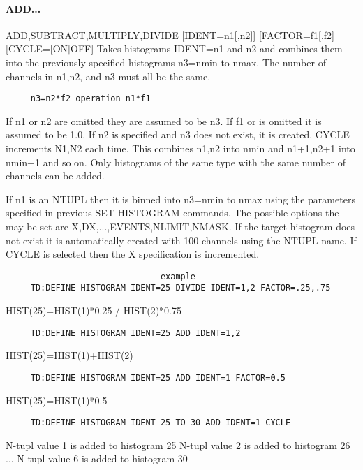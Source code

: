 \paragraph{ADD...       }
ADD,SUBTRACT,MULTIPLY,DIVIDE      [IDENT=n1[,n2]]     [FACTOR=f1[,f2]
[CYCLE=[ON$|$OFF] 
Takes   histograms  IDENT=n1  and  n2  and  combines  them  into  the
previously specified histograms  n3=nmin  to  nmax.   The  number  of
channels in n1,n2, and n3 must all be the same.  
\begin{verbatim}
     n3=n2*f2 operation n1*f1 
\end{verbatim}
If  n1  or  n2  are  omitted  they are assumed to be n3.  If f1 or is
omitted it is assumed to be 1.0.  If n2 is specified and n3 does  not
exist,  it  is  created.   CYCLE  increments  N1,N2  each time.  This
combines n1,n2 into nmin and n1+1,n2+1 into nmin+1 and so  on.   Only
histograms  of  the same type with the same number of channels can be
added.  

If  n1  is  an NTUPL then it is binned into n3=nmin to nmax using the
parameters  specified  in  previous  SET  HISTOGRAM  commands.    The
possible options the may be set are X,DX,...,EVENTS,NLIMIT,NMASK.  If
the target histogram does not exist it is automatically created  with
100  channels  using the NTUPL name.  If CYCLE is selected then the X
specification is incremented.  
\begin{verbatim}
                               example
     TD:DEFINE HISTOGRAM IDENT=25 DIVIDE IDENT=1,2 FACTOR=.25,.75 
\end{verbatim}
HIST(25)=HIST(1)*0.25 / HIST(2)*0.75 
\begin{verbatim}
     TD:DEFINE HISTOGRAM IDENT=25 ADD IDENT=1,2 
\end{verbatim}
HIST(25)=HIST(1)+HIST(2) 
\begin{verbatim}
     TD:DEFINE HISTOGRAM IDENT=25 ADD IDENT=1 FACTOR=0.5 
\end{verbatim}
HIST(25)=HIST(1)*0.5 
\begin{verbatim}
     TD:DEFINE HISTOGRAM IDENT 25 TO 30 ADD IDENT=1 CYCLE 
\end{verbatim}
N-tupl value 1 is added to histogram 25 
N-tupl value 2 is added to histogram 26 
...  
N-tupl value 6 is added to histogram 30 
